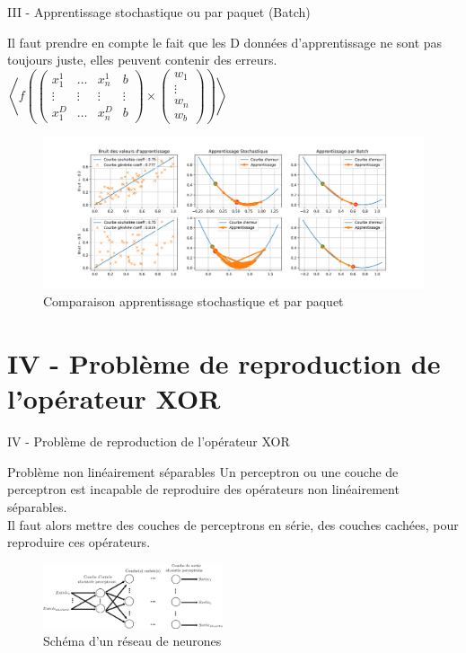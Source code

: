 \documentclass[10pt]{beamer}
\begin{document}
\begin{frame}{III - Apprentissage stochastique ou par paquet (Batch)}

\begin{multicols}{2}
Il faut prendre en compte le fait que les D données d'apprentissage ne sont pas toujours juste, elles peuvent contenir des erreurs. 
\columnbreak
$
\left< f
\left(
\begin{pmatrix}
x_1^{1} & \ldots & x_n^{1} & b \\
\vdots & \vdots & \vdots & \vdots \\
x_1^{D} & \ldots & x_n^{D} & b
\end{pmatrix}
\times
\begin{pmatrix}
w_1 \\
\vdots \\
w_n \\
w_b
\end{pmatrix}
\right) \right>
$
\end{multicols}
\begin{figure}
	\centering
    \includegraphics[width=\paperwidth, trim=0 30 0 30, clip]{5-Batch.jpg}
	\caption{Comparaison apprentissage stochastique et par paquet}
\end{figure}
\end{frame}

\section{IV - Problème de reproduction de l'opérateur XOR}
\begin{frame}{IV - Problème de reproduction de l'opérateur XOR}
\begin{block}{Problème non linéairement séparables}
Un perceptron ou une couche de perceptron est incapable de reproduire des opérateurs non linéairement séparables. \\
Il faut alors mettre des couches de perceptrons en série, des couches cachées, pour reproduire ces opérateurs. \\
\end{block}
\begin{figure}
	\centering
    \includegraphics[width=200px]{1-Reseau.png}
	\caption{Schéma d'un réseau de neurones}
\end{figure}
\end{frame}
\end{document}
